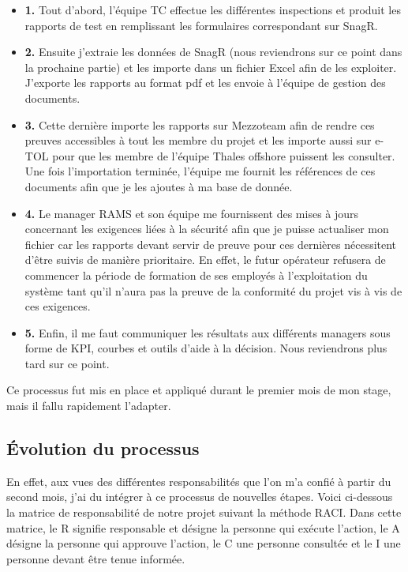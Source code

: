 \begin{itemize}
\item \textbf{1.} Tout d'abord, l'équipe \gls{TC} effectue les différentes inspections et produit les rapports de test en remplissant les formulaires correspondant sur \gls{SnagR}.  
\item \textbf{2.} Ensuite j'extraie les données de \gls{SnagR} (nous reviendrons sur ce point dans la prochaine partie) et les importe dans un fichier Excel afin de les exploiter. J'exporte les rapports au format pdf et les envoie à l'équipe de gestion des documents.
\item \textbf{3.} Cette dernière importe les rapports sur \gls{Mezzoteam} afin de rendre ces preuves accessibles à tout les membre du projet et les importe aussi sur \gls{e-TOL} pour que les membre de l'équipe Thales offshore puissent les consulter. Une fois l'importation terminée, l'équipe me fournit les références de ces documents afin que je les ajoutes à ma base de donnée.
\item \textbf{4.} Le manager \gls{RAMS} et son équipe me fournissent des mises à jours concernant les exigences liées à la sécurité afin que je puisse actualiser mon fichier car les rapports devant servir de preuve pour ces dernières nécessitent d'être suivis de manière prioritaire. En effet, le futur opérateur refusera de commencer la période de formation de ses employés à l'exploitation du système tant qu'il n'aura pas la preuve de la conformité du projet vis à vis de ces exigences.
\item \textbf{5.} Enfin, il me faut communiquer les résultats aux différents managers sous forme de \gls{KPI}, courbes et outils d'aide à la décision. Nous reviendrons plus tard sur ce point.
\end{itemize}

Ce processus fut mis en place et appliqué durant le premier mois de mon stage, mais il fallu rapidement l'adapter.

\subsection{Évolution du processus}

En effet, aux vues des différentes responsabilités que l'on m'a confié à partir du second mois, j'ai du intégrer à ce processus de nouvelles étapes. 
Voici ci-dessous la matrice de responsabilité de notre projet suivant la méthode RACI. Dans cette matrice, le R signifie responsable et désigne la personne qui exécute l'action, le A désigne la personne qui approuve l'action, le C une personne consultée et le I une personne devant être tenue informée.

